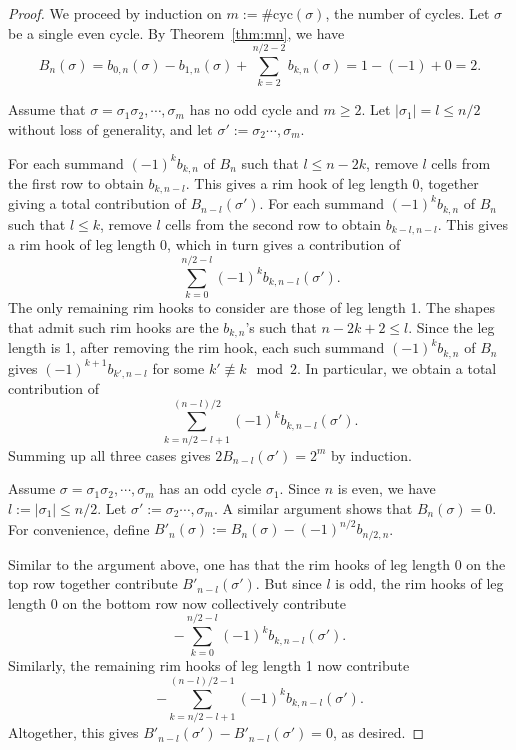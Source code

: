 \documentclass[12pt]{article}
\begin{document}
\begin{proof}
We proceed by induction on $m := \#\mathrm{cyc}(\sigma)$, the number of cycles. Let $\sigma$ be a single even cycle. By Theorem~\ref{thm:mn}, we have
$$B_n(\sigma) = b_{0,n}(\sigma) - b_{1,n}(\sigma) + \sum_{k=2}^{n/2 - 2} b_{k,n}(\sigma) = 1 - (-1) + 0 = 2.$$
	
Assume that $\sigma = \sigma_1\sigma_2,\cdots,\sigma_m$ has no odd cycle and $m \geq 2$. Let $|\sigma_1| = l \leq n/2$ without loss of generality, and let $\sigma' := \sigma_2  \cdots, \sigma_m$. 

For each summand $(-1)^kb_{k,n}$ of $B_n$ such that $l \leq n-2k$, remove $l$ cells from the first row to obtain $b_{k,n-l}$. This gives a rim hook of leg length 0, together giving a total contribution of $B_{n-l}(\sigma')$. For each summand $(-1)^kb_{k,n}$ of $B_n$ such that $l \leq k$, remove $l$ cells from the second row to obtain $b_{k-l,n-l}$. This gives a rim hook of leg length 0, which in turn gives a contribution of 
$$\sum_{k=0}^{n/2 - l} (-1)^k b_{k,n-l}(\sigma').$$ 
The only remaining rim hooks to consider are those of leg length 1. The shapes that admit such rim hooks are the $b_{k,n}$'s such that $n-2k+2 \leq l$. Since the leg length is 1, after removing the rim hook, each such summand $(-1)^kb_{k,n}$ of $B_n$ gives $(-1)^{k+1} b_{k',n-l}$ for some $k' \not \equiv k \mod 2$. In particular, we obtain a total contribution of 
$$\sum_{k=n/2 - l + 1}^{(n-l)/2} (-1)^{k} b_{k,n-l}(\sigma').$$ 
Summing up all three cases gives $2B_{n-l}(\sigma') = 2^{m}$ by induction. 

\medskip

Assume $\sigma = \sigma_1\sigma_2,\cdots,\sigma_m$ has an odd cycle $\sigma_1$. Since $n$ is even, we have $l := |\sigma_1| \leq n/2$. Let $\sigma' := \sigma_2  \cdots, \sigma_m$. A similar argument shows that $B_n(\sigma) = 0$. For convenience, define $B'_{n}(\sigma) := B_{n}(\sigma) - (-1)^{n/2}b_{n/2,n}$.


Similar to the argument above, one has that the rim hooks of leg length 0 on the top row together contribute $B'_{n-l}(\sigma')$. But since $l$ is odd, the rim hooks of leg length 0 on the bottom row now collectively contribute 
$$-\sum_{k=0}^{n/2 - l} (-1)^k b_{k,n-l}(\sigma').$$ 
Similarly, the remaining rim hooks of leg length 1 now contribute 
$$-\sum_{k=n/2 - l + 1}^{(n-l)/2 - 1} (-1)^{k} b_{k,n-l}(\sigma').$$ 
Altogether, this gives $B'_{n-l}(\sigma') - B'_{n-l}(\sigma') = 0$, as desired.
\end{proof}
\end{document}
